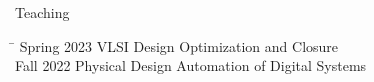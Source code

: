 
\begin{rSection}{Teaching}
\begin{tabbing}
\hspace{1.0in}\= \kill
    Spring 2023 \> VLSI Design Optimization and Closure \\
    Fall 2022 \> Physical Design Automation of Digital Systems \\
\end{tabbing}
\end{rSection}
